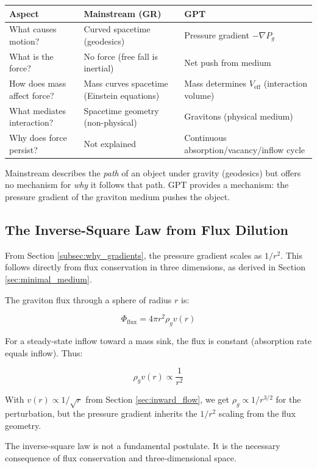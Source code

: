 \documentclass[12pt, a4paper]{article}
\begin{document}
\begin{center}
\begin{tabular}{|p{3cm}|p{5cm}|p{5cm}|}
\hline
\textbf{Aspect} & \textbf{Mainstream (GR)} & \textbf{GPT} \\
\hline
What causes motion? & Curved spacetime (geodesics) & Pressure gradient \( -\nabla P_g \) \\
\hline
What is the force? & No force (free fall is inertial) & Net push from medium \\
\hline
How does mass affect force? & Mass curves spacetime (Einstein equations) & Mass determines \( V_{\text{eff}} \) (interaction volume) \\
\hline
What mediates interaction? & Spacetime geometry (non-physical) & Gravitons (physical medium) \\
\hline
Why does force persist? & Not explained & Continuous absorption/vacancy/inflow cycle \\
\hline
\end{tabular}
\end{center}

Mainstream describes the \textit{path} of an object under gravity (geodesics) but offers no mechanism for \textit{why} it follows that path. GPT provides a mechanism: the pressure gradient of the graviton medium pushes the object.

\subsection{The Inverse-Square Law from Flux Dilution}
\label{subsec:inverse_square}

From Section \ref{subsec:why_gradients}, the pressure gradient scales as \( 1/r^2 \). This follows directly from flux conservation in three dimensions, as derived in Section \ref{sec:minimal_medium}.

The graviton flux through a sphere of radius \( r \) is:

\[
\Phi_{\text{flux}} = 4\pi r^2 \rho_g v(r)
\]

For a steady-state inflow toward a mass sink, the flux is constant (absorption rate equals inflow). Thus:

\[
\rho_g v(r) \propto \frac{1}{r^2}
\]

With \( v(r) \propto 1/\sqrt{r} \) from Section \ref{sec:inward_flow}, we get \( \rho_g \propto 1/r^{3/2} \) for the perturbation, but the pressure gradient inherits the \( 1/r^2 \) scaling from the flux geometry.

The inverse-square law is not a fundamental postulate. It is the necessary consequence of flux conservation and three-dimensional space.
\end{document}
